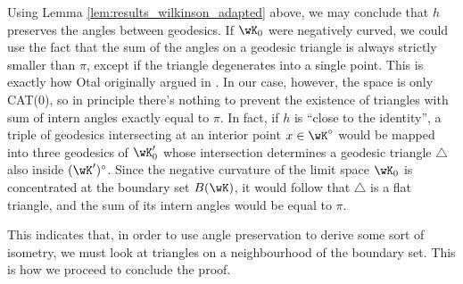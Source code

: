 \documentclass[reqno,11pt]{amsart}
\begin{document}
Using Lemma \ref{lem:results_wilkinson_adapted} above, we may conclude that \(h\) preserves the angles between geodesics. 
If \(\wK_0\) were negatively curved, we could use the fact that the sum of the angles on a geodesic triangle is always strictly smaller than \(\pi\), except if the triangle degenerates into a single point. 
This is exactly how Otal originally argued in \cite{otal_spectre_1990}.
In our case, however, the space is only CAT(0), so in principle there's nothing to prevent the existence of triangles with sum of intern angles exactly equal to \(\pi\).
In fact, if \(h\) is ``close to the identity'', a triple of geodesics intersecting at an interior point \(x \in \wK^\circ\) would be mapped into three geodesics of \(\wK_0'\) whose intersection determines a geodesic triangle \(\triangle\) also inside \((\wK')^\circ\).
Since the negative curvature of the limit space \(\wK_0\) is concentrated at the boundary set \(B(\wK)\), it would follow that \(\triangle\) is a flat triangle, and the sum of its intern angles would be equal to \(\pi\).
\par This indicates that, in order to use angle preservation to derive some sort of isometry, we must look at triangles on a neighbourhood of the boundary set.
This is how we proceed to conclude the proof.
\end{document}
